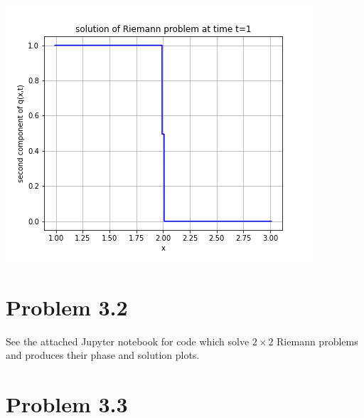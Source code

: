 \documentclass{article}
\begin{document}
\includegraphics[scale=0.7]{partf2.png}\\

\section{Problem 3.2}
See the attached Jupyter notebook for code which solve $2\times 2$ Riemann problems and produces their phase and solution plots.

\section{Problem 3.3}
\end{document}

